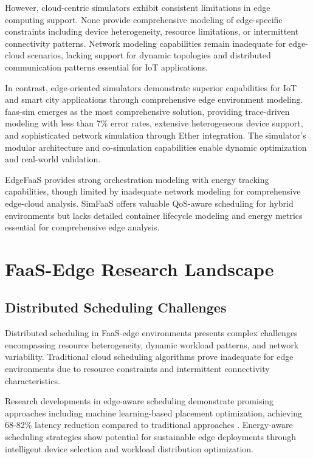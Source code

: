 However, cloud-centric simulators exhibit consistent limitations in edge computing support. None provide comprehensive modeling of edge-specific constraints including device heterogeneity, resource limitations, or intermittent connectivity patterns. Network modeling capabilities remain inadequate for edge-cloud scenarios, lacking support for dynamic topologies and distributed communication patterns essential for IoT applications.

In contrast, edge-oriented simulators demonstrate superior capabilities for IoT and smart city applications through comprehensive edge environment modeling. faas-sim emerges as the most comprehensive solution, providing trace-driven modeling with less than 7\% error rates, extensive heterogeneous device support, and sophisticated network simulation through Ether integration. The simulator's modular architecture and co-simulation capabilities enable dynamic optimization and real-world validation.

EdgeFaaS provides strong orchestration modeling with energy tracking capabilities, though limited by inadequate network modeling for comprehensive edge-cloud analysis. SimFaaS offers valuable QoS-aware scheduling for hybrid environments but lacks detailed container lifecycle modeling and energy metrics essential for comprehensive edge analysis.


\section{FaaS-Edge Research Landscape}

\subsection{Distributed Scheduling Challenges}

Distributed scheduling in FaaS-edge environments presents complex challenges encompassing resource heterogeneity, dynamic workload patterns, and network variability. Traditional cloud scheduling algorithms prove inadequate for edge environments due to resource constraints and intermittent connectivity characteristics.

Research developments in edge-aware scheduling demonstrate promising approaches including machine learning-based placement optimization, achieving 68-82\% latency reduction compared to traditional approaches \cite{wang2021edgeserve}. Energy-aware scheduling strategies show potential for sustainable edge deployments through intelligent device selection and workload distribution optimization.

